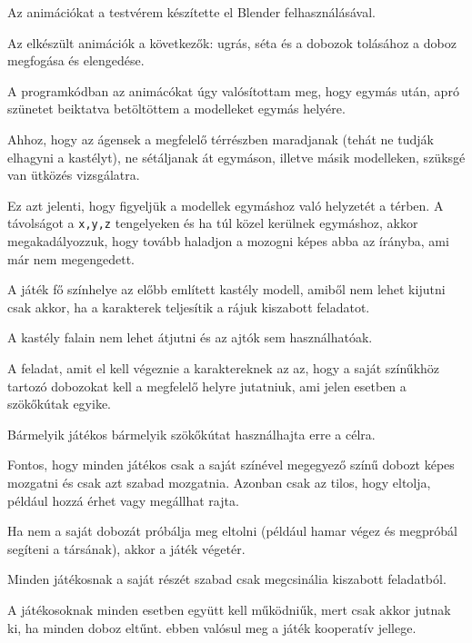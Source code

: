 Az animációkat a testvérem készítette el Blender felhasználásával. 

Az elkészült animációk a következők: ugrás, séta és a dobozok tolásához a doboz megfogása és elengedése.
 
A programkódban az animácókat úgy valósítottam meg, hogy egymás után, apró szünetet beiktatva betöltöttem a modelleket egymás helyére.
 

Ahhoz, hogy az ágensek a megfelelő térrészben maradjanak (tehát ne tudják elhagyni a kastélyt), ne sétáljanak át egymáson, illetve másik modelleken, szüksgé van ütközés vizsgálatra.

Ez azt jelenti, hogy figyeljük a modellek egymáshoz való helyzetét a térben. A távolságot a \texttt{x,y,z} tengelyeken és ha túl közel kerülnek egymáshoz, akkor megakadályozzuk, hogy tovább haladjon a mozogni képes abba az írányba, ami már nem megengedett.


A játék fő színhelye az előbb említett kastély modell, amiből nem lehet kijutni csak akkor, ha a karakterek teljesítik a rájuk kiszabott feladatot.

A kastély falain nem lehet átjutni és az ajtók sem használhatóak.

A feladat, amit el kell végeznie a karaktereknek az az, hogy a saját színűkhöz tartozó dobozokat kell a megfelelő helyre jutatniuk, ami jelen esetben a szökőkútak egyike. 

Bármelyik játékos bármelyik szökőkútat használhajta erre a célra.

Fontos, hogy minden játékos csak a saját színével megegyező színű dobozt képes mozgatni és csak azt szabad mozgatnia. Azonban csak az tilos, hogy eltolja, például hozzá érhet vagy megállhat rajta. 

Ha nem a saját dobozát próbálja meg eltolni (például hamar végez és megpróbál segíteni a társának), akkor a játék végetér.

Minden játékosnak a saját részét szabad csak megcsinália  kiszabott feladatból. 

A játékosoknak minden esetben együtt kell működniűk, mert csak akkor jutnak ki, ha minden doboz eltűnt. ebben valósul meg a játék kooperatív jellege. 

